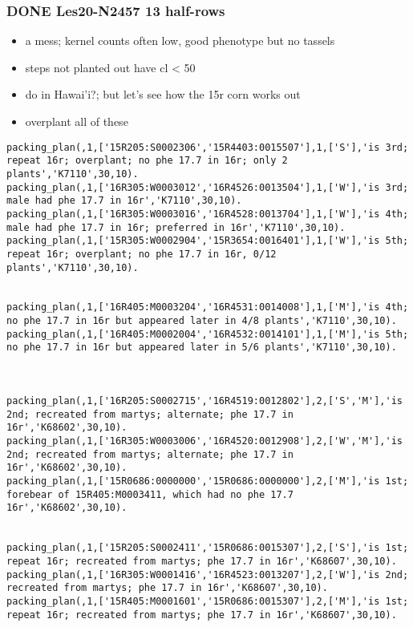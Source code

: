 \documentclass[11pt]{article}
\begin{document}
\subsubsection{{\bfseries\sffamily DONE} Les20-N2457  13 half-rows}
\label{sec-4-5-10}


\begin{itemize}
\item a mess; kernel counts often low, good phenotype but no tassels

\item steps not planted out have cl < 50

\item do in Hawai'i?; but let's see how the 15r corn works out

\item overplant all of these
\end{itemize}

\begin{verbatim}
packing_plan(,1,['15R205:S0002306','15R4403:0015507'],1,['S'],'is 3rd; repeat 16r; overplant; no phe 17.7 in 16r; only 2 plants','K7110',30,10).
packing_plan(,1,['16R305:W0003012','16R4526:0013504'],1,['W'],'is 3rd; male had phe 17.7 in 16r','K7110',30,10).
packing_plan(,1,['16R305:W0003016','16R4528:0013704'],1,['W'],'is 4th; male had phe 17.7 in 16r; preferred in 16r','K7110',30,10).
packing_plan(,1,['15R305:W0002904','15R3654:0016401'],1,['W'],'is 5th; repeat 16r; overplant; no phe 17.7 in 16r, 0/12 plants','K7110',30,10).


packing_plan(,1,['16R405:M0003204','16R4531:0014008'],1,['M'],'is 4th; no phe 17.7 in 16r but appeared later in 4/8 plants','K7110',30,10).
packing_plan(,1,['16R405:M0002004','16R4532:0014101'],1,['M'],'is 5th; no phe 17.7 in 16r but appeared later in 5/6 plants','K7110',30,10).



packing_plan(,1,['16R205:S0002715','16R4519:0012802'],2,['S','M'],'is 2nd; recreated from martys; alternate; phe 17.7 in 16r','K68602',30,10).
packing_plan(,1,['16R305:W0003006','16R4520:0012908'],2,['W','M'],'is 2nd; recreated from martys; alternate; phe 17.7 in 16r','K68602',30,10).
packing_plan(,1,['15R0686:0000000','15R0686:0000000'],2,['M'],'is 1st; forebear of 15R405:M0003411, which had no phe 17.7 16r','K68602',30,10).


packing_plan(,1,['15R205:S0002411','15R0686:0015307'],2,['S'],'is 1st; repeat 16r; recreated from martys; phe 17.7 in 16r','K68607',30,10).
packing_plan(,1,['16R305:W0001416','16R4523:0013207'],2,['W'],'is 2nd; recreated from martys; phe 17.7 in 16r','K68607',30,10).
packing_plan(,1,['15R405:M0001601','15R0686:0015307'],2,['M'],'is 1st; repeat 16r; recreated from martys; phe 17.7 in 16r','K68607',30,10).
\end{verbatim}
\end{document}
